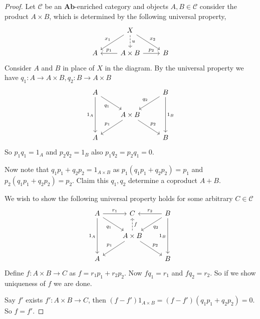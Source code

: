 \documentclass[12pt]{report}
\numberwithin{equation}{section}
\begin{document}
	\begin{proof}	
		Let $\mathcal{C}$ be an $\mathbf{Ab}$-enriched category and objects $A,B\in \mathcal{C}$ consider the product $A\times B$, which is determined by the following universal property,
		\[\begin{tikzcd}
			& X \\
			A & A\times B & B
			\arrow["{p_1}"', from=2-2, to=2-1]
			\arrow["{p_2}", from=2-2, to=2-3]
			\arrow["u", dashed, from=1-2, to=2-2]
			\arrow["{x_1}"', from=1-2, to=2-1]
			\arrow["{x_2}", from=1-2, to=2-3]
		\end{tikzcd}\]
		Consider $A$ and $B$ in place of $X $ in the diagram. By the universal property we have $q_1: A \to A\times B, q_2: B \to A\times B$
		\[\begin{tikzcd}
			A && B \\
			& {A\times B} \\
			A && B
			\arrow["{p_1}"', from=2-2, to=3-1]
			\arrow["{p_2}", from=2-2, to=3-3]
			\arrow["{q_2}"', from=1-3, to=2-2]
			\arrow["{q_1}"', from=1-1, to=2-2]
			\arrow["{1_A}"', from=1-1, to=3-1]
			\arrow["{1_B}", from=1-3, to=3-3]
		\end{tikzcd}\]
		So $p_1q_1=1_A$ and $p_2q_2=1_B$ also $p_1q_2=p_2q_1=0$.
		
		Now note that $q_1p_1+q_2p_2=1_{A\times B}$ as $p_1(q_1p_1+q_2p_2)=p_1$ and $p_2(q_1p_1+q_2p_2)=p_2$. Claim this $q_1,q_2$ determine a coproduct $A +B$.
		
		We wish to show the following universal property holds for some arbitrary $C \in \mathcal{C}$
		\[\begin{tikzcd}
			A & C & B \\
			& {A\times B} \\
			A && B
			\arrow["{q_1}"', from=1-1, to=2-2]
			\arrow["{q_2}", from=1-3, to=2-2]
			\arrow["{p_1}"', from=2-2, to=3-1]
			\arrow["{p_2}", from=2-2, to=3-3]
			\arrow["{1_B}"', from=1-3, to=3-3]
			\arrow["{1_A}"', from=1-1, to=3-1]
			\arrow["{r_1}", from=1-1, to=1-2]
			\arrow["{r_2}"', from=1-3, to=1-2]
			\arrow["{f}"',dashed, from=2-2, to=1-2]
		\end{tikzcd}\]
		Define $f: A\times B \to C$ as $f=r_1p_1+r_2p_2$. Now $fq_1=r_1$ and $fq_2=r_2$. So if we show uniqueness of $f$ we are done.
		
		Say $f'$ exists \( f':A \times B \to C \), then $(f-f')1_{A \times B}=(f-f')(q_1p_1+q_2p_2)=0$. So $f=f'$.
		
		
	\end{proof}
	
\end{document}
